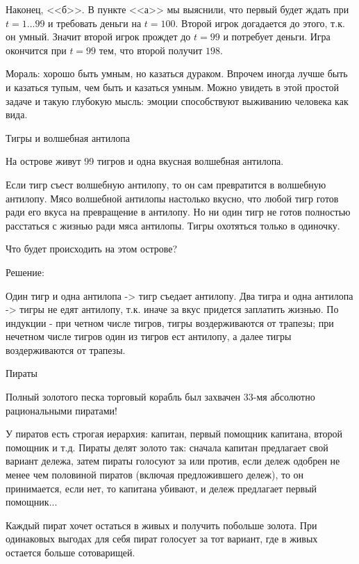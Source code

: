 \documentclass[pdftex,12pt,a4paper]{article}
\begin{document}
Наконец, <<б>>. В пункте <<а>> мы выяснили, что первый будет ждать при $t=1...99$ и требовать деньги на $t=100$. Второй игрок догадается до этого, т.к. он умный. Значит второй игрок прождет до $t=99$ и потребует деньги. Игра окончится при $t=99$ тем, что второй получит $198$.

Мораль: хорошо быть умным, но казаться дураком. Впрочем иногда лучше быть и казаться тупым, чем быть и казаться умным. Можно увидеть в этой простой задаче и такую глубокую мысль: эмоции способствуют выживанию человека как вида.

\vspace{10pt}
Тигры и волшебная антилопа \par
На острове живут 99 тигров и одна вкусная волшебная антилопа. \par
Если тигр съест волшебную антилопу, то он сам превратится в волшебную антилопу. Мясо волшебной антилопы настолько вкусно, что любой тигр готов ради его вкуса на превращение в антилопу. Но ни один тигр не готов полностью расстаться с жизнью ради мяса антилопы. Тигры охотяться только в одиночку.\par
Что будет происходить на этом острове? \par

\vspace{10pt}
Решение:

 Один тигр и одна антилопа -> тигр съедает антилопу. Два тигра и одна антилопа -> тигры не едят антилопу, т.к. иначе за вкус придется заплатить жизнью. По индукции - при четном числе тигров, тигры воздерживаются от трапезы; при нечетном числе тигров один из тигров ест антилопу, а далее тигры воздерживаются от трапезы. 

\vspace{10pt}
Пираты  \par
Полный золотого песка торговый корабль был захвачен  $33$-мя  абсолютно рациональными пиратами! \par
У пиратов есть строгая иерархия: капитан, первый помощник капитана, второй помощник и т.д. Пираты делят золото так: сначала капитан предлагает свой вариант дележа, затем пираты голосуют за или против, если дележ одобрен не менее чем половиной пиратов (включая предложившего дележ), то он принимается, если нет, то капитана убивают, и дележ предлагает первый помощник...\par
Каждый пират хочет остаться в живых и получить побольше золота. При одинаковых выгодах для себя пират голосует за тот вариант, где в живых остается больше сотоварищей.\par
\end{document}
